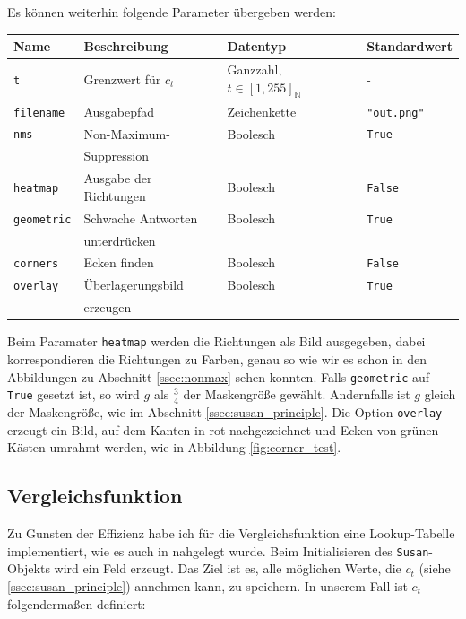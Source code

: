 \documentclass[a4paper, 11pt]{report}
\theoremstyle{definition}
\begin{document}
		Es können weiterhin folgende Parameter übergeben werden:
		\begin{center}
			\begin{tabular}{|l|l|l|l|}
				\hline
				\textbf{Name} 		& \textbf{Beschreibung} 	& \textbf{Datentyp}							& \textbf{Standardwert}	\\
				\hline
				\texttt{t}			& Grenzwert	für $c_t$		& Ganzzahl, $t \in [1,255]_\mathbb{N}$		& -\\
				\hline
				\texttt{filename}	& Ausgabepfad				& Zeichenkette								& \texttt{"{}out.png"}\\
				\hline
				\texttt{nms}		& Non-Maximum-				& Boolesch									& \texttt{True}\\
									& Suppression & & \\
				\hline
				\texttt{heatmap}	& Ausgabe der Richtungen 	& Boolesch									& \texttt{False}\\
				\hline
				\texttt{geometric}	& Schwache Antworten 		& Boolesch 									& \texttt{True} \\
									& unterdrücken & & \\
				\hline
				\texttt{corners}	& Ecken finden				& Boolesch									& \texttt{False} \\
				\hline
				\texttt{overlay}	& Überlagerungsbild 		& Boolesch									& \texttt{True} \\
									& erzeugen & & \\
				\hline
			\end{tabular}
		\end{center}

		Beim Paramater \texttt{heatmap} werden die Richtungen als Bild ausgegeben, dabei korrespondieren die Richtungen zu Farben, genau so wie wir es schon in den Abbildungen zu Abschnitt \ref{ssec:nonmax} sehen konnten.
		Falls \texttt{geometric} auf \texttt{True} gesetzt ist, so wird $g$ als $\frac{3}{4}$ der Maskengröße gewählt. Andernfalls ist $g$ gleich der Maskengröße, wie im Abschnitt \ref{ssec:susan_principle}.
		Die Option \texttt{overlay} erzeugt ein Bild, auf dem Kanten in rot nachgezeichnet und Ecken von grünen Kästen umrahmt werden, wie in Abbildung \ref{fig:corner_test}.

			\subsection{Vergleichsfunktion}
				Zu Gunsten der Effizienz habe ich für die Vergleichsfunktion eine Lookup-Tabelle implementiert, wie es auch in \cite{SUSAN} nahgelegt wurde. Beim Initialisieren des \texttt{Susan}-Objekts wird ein Feld erzeugt. Das Ziel ist es, alle möglichen Werte, die $c_t$ (siehe \ref{ssec:susan_principle}) annehmen kann, zu speichern.
				In unserem Fall ist $c_t$ folgendermaßen definiert:
				
\end{document}
